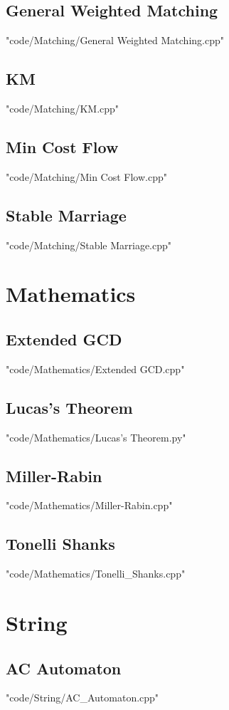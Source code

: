 \documentclass [landscape,8pt,a4paper,twocolumn]{article}
\begin{document}
\subsection{General Weighted Matching}
 {"code/Matching/General Weighted Matching.cpp"}
\subsection{KM}
 {"code/Matching/KM.cpp"}
\subsection{Min Cost Flow}
 {"code/Matching/Min Cost Flow.cpp"}
\subsection{Stable Marriage}
 {"code/Matching/Stable Marriage.cpp"}
\section{Mathematics}
\subsection{Extended GCD}
 {"code/Mathematics/Extended GCD.cpp"}
\subsection{Lucas's Theorem}
 {"code/Mathematics/Lucas's Theorem.py"}
\subsection{Miller-Rabin}
 {"code/Mathematics/Miller-Rabin.cpp"}
\subsection{Tonelli Shanks}
 {"code/Mathematics/Tonelli_Shanks.cpp"}
\section{String}
\subsection{AC Automaton}
 {"code/String/AC_Automaton.cpp"}
\end{document}
